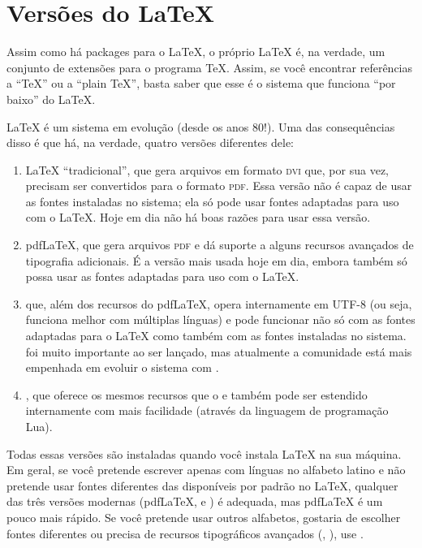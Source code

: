 \section{Versões do \LaTeX{}}
\label{sec:versions}

Assim como há packages para o \LaTeX{}, o próprio \LaTeX{} é, na verdade, um
conjunto de extensões para o programa \TeX{}. Assim, se você encontrar
referências a ``\TeX{}'' ou a ``plain \TeX{}'', basta saber que esse é o
sistema que funciona ``por baixo'' do \LaTeX{}.

\LaTeX{} é um sistema em evolução (desde os anos 80!). Uma das consequências
disso é que há, na verdade, quatro versões diferentes dele:

\begin{enumerate}
\item \LaTeX{} ``tradicional'', que gera arquivos em formato \textsc{dvi}
que, por sua vez, precisam ser convertidos para o formato \textsc{pdf}.
Essa versão não é capaz de usar as fontes instaladas no sistema; ela só
pode usar fontes adaptadas para uso com o \LaTeX{}. Hoje em dia não há
boas razões para usar essa versão.

\item pdf\LaTeX{}, que gera arquivos \textsc{pdf} e dá suporte a alguns
recursos avançados de tipografia adicionais. É a versão mais usada hoje
em dia, embora também só possa usar as fontes adaptadas para uso com o
\LaTeX{}.

\item \XeLaTeX{} que, além dos recursos do pdf\LaTeX{}, opera internamente
em UTF-8 (ou seja, funciona melhor com múltiplas línguas) e pode funcionar
não só com as fontes adaptadas para o \LaTeX{} como também com as fontes
instaladas no sistema. \XeLaTeX{} foi muito importante ao ser lançado,
mas atualmente a comunidade está mais empenhada em evoluir o sistema com
\LuaLaTeX{}.

\item \LuaLaTeX{}, que oferece os mesmos recursos que o \XeLaTeX{} e
também pode ser estendido internamente com mais facilidade (através da
linguagem de programação Lua).
\end{enumerate}

Todas essas versões são instaladas quando você instala \LaTeX{} na
sua máquina. Em geral, se você pretende escrever apenas com línguas no
alfabeto latino e não pretende usar fontes diferentes das disponíveis
por padrão no \LaTeX{}, qualquer das três versões modernas (pdf\LaTeX{},
\XeLaTeX{} e \LuaLaTeX{}) é adequada, mas pdf\LaTeX{} é um pouco mais
rápido. Se você pretende usar outros alfabetos, gostaria de escolher
fontes diferentes ou precisa de recursos tipográficos avançados
(, ), use \LuaLaTeX{}.

